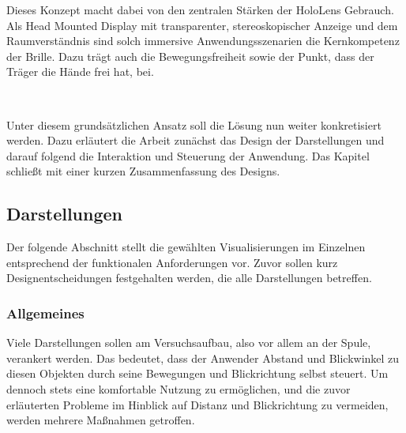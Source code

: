 Dieses Konzept macht dabei von den zentralen Stärken der HoloLens Gebrauch. Als Head Mounted Display mit transparenter, stereoskopischer Anzeige und dem Raumverständnis sind solch immersive Anwendungsszenarien die Kernkompetenz der Brille. Dazu trägt auch die Bewegungsfreiheit sowie der Punkt, dass der Träger die Hände frei hat, bei.

\vspace{8px}
\begin{center}
	\\
\end{center}
\vspace{6px}


Unter diesem grundsätzlichen Ansatz soll die Lösung nun weiter konkretisiert werden. Dazu erläutert die Arbeit zunächst das Design der Darstellungen und darauf folgend die Interaktion und Steuerung der Anwendung. Das Kapitel schließt mit einer kurzen Zusammenfassung des Designs.

\subsection{Darstellungen}
\label{sec-4-2}
Der folgende Abschnitt stellt die gewählten Visualisierungen im Einzelnen entsprechend der funktionalen Anforderungen vor. Zuvor sollen kurz Designentscheidungen festgehalten werden, die alle Darstellungen betreffen.\\

\subsubsection{Allgemeines}
\label{sec-4-2-1}
Viele Darstellungen sollen am Versuchsaufbau, also vor allem an der Spule, verankert werden. Das bedeutet, dass der Anwender Abstand und Blickwinkel zu diesen Objekten durch seine Bewegungen und Blickrichtung selbst steuert. Um dennoch stets eine komfortable Nutzung zu ermöglichen, und die zuvor erläuterten Probleme im Hinblick auf Distanz und Blickrichtung zu vermeiden, werden mehrere Maßnahmen getroffen.\\


